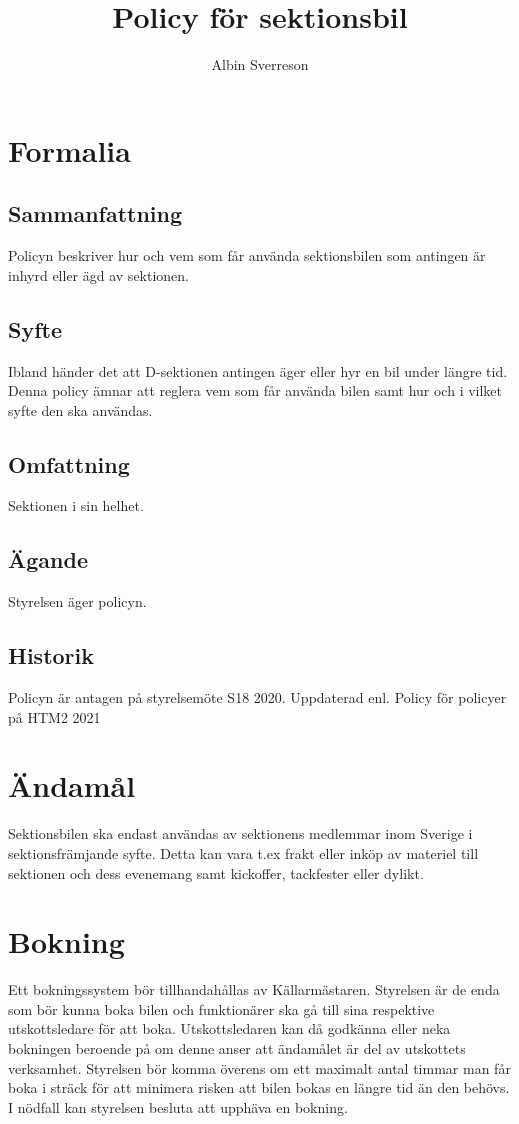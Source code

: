 \documentclass{dsekprotokoll}
\author{Albin Sverreson}
\title{Policy för sektionsbil}
\begin{document}
\maketitle
\section{Formalia}
\subsection{Sammanfattning}
Policyn beskriver hur och vem som får använda sektionsbilen som antingen är inhyrd eller ägd av sektionen.
\subsection{Syfte}
Ibland händer det att D-sektionen antingen äger eller hyr en bil under längre tid. Denna policy ämnar att reglera vem som får använda bilen samt hur och i vilket syfte den ska användas.
\subsection{Omfattning}
Sektionen i sin helhet.
\subsection{Ägande}
Styrelsen äger policyn.
\subsection{Historik}
Policyn är antagen på styrelsemöte S18 2020.
Uppdaterad enl. Policy för policyer på HTM2 2021


\section{Ändamål}
Sektionsbilen ska endast användas av sektionens medlemmar inom Sverige i sektionsfrämjande syfte. Detta kan vara t.ex frakt eller inköp av materiel till sektionen och dess evenemang samt kickoffer, tackfester eller dylikt.
\section{Bokning}
Ett bokningssystem bör tillhandahållas av Källarmästaren. Styrelsen är de enda som bör kunna boka bilen och funktionärer ska gå till sina respektive utskottsledare för att boka. Utskottsledaren kan då godkänna eller neka bokningen beroende på om denne anser att ändamålet är del av utskottets verksamhet. Styrelsen bör komma överens om ett maximalt antal timmar man får boka i sträck för att minimera risken att bilen bokas en längre tid än den behövs. I nödfall kan styrelsen besluta att upphäva en bokning.
\end{document}
